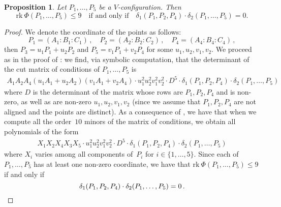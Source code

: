 \documentclass{amsart}
\theoremstyle{plain}
\newtheorem{prop}[lemma]{Proposition}
\theoremstyle{definition}
\newcommand{\rk}{\ensuremath{\mathrm{rk}}}
\begin{document}
\begin{prop}
\label{prop:d1d2}
Let $P_1, \dots, P_5$ be a $V$-configuration. Then
\[
\rk \ \Phi(P_1, \dots, P_5) \leq 9
\quad \mbox{
if and only if} \quad
\delta_1(P_1, P_2, P_4) \cdot \delta_2(P_1, \dots, P_5) = 0.
\]
\end{prop}
\begin{proof}
We denote the coordinate of the points as follows:
%
\[
 P_1 = (A_1: B_1: C_1) \,, \quad
 P_2 = (A_2: B_2: C_2) \,, \quad
 P_4 = (A_4: B_4: C_4) \,,
\]
%
then $P_3 = u_1P_1+u_2P_2$ and $P_5 = v_1P_1+v_2P_4$ for some $u_1, u_2, v_1, v_2$.
We proceed as in
the proof of : we find, via symbolic computation, that the determinant of
the cut matrix of conditions of $P_1, \dotsc, P_5$ is
%
\begin{gather}
\label{delta1delta2}
A_1A_2A_4(u_1A_1+u_2A_2)(v_1A_1+v_2A_4) \cdot u_1^2u_2^2v_1^2v_2^2 \cdot D^5 \cdot
\delta_1(P_1,P_2,P_4) \cdot \delta_2(P_1,\dots,P_5)
\end{gather}
%
where $D$ is the determinant of the matrix whose rows are $P_1, P_2, P_4$
and is non-zero, as well as are non-zero $u_1, u_2, v_1, v_2$ (since we
assume that $P_1, P_2, P_4$ are not aligned and the points are distinct).
As a consequence of , we have that when we compute all the order~$10$ minors of the matrix of conditions, we obtain all polynomials of the form
%
\begin{gather*}
X_1X_2X_4 X_3 X_5 \cdot u_1^2u_2^2v_1^2v_2^2 \cdot D^5 \cdot
\delta_1(P_1,P_2,P_4) \cdot \delta_2(P_1,\dots,P_5)
\end{gather*}
%
where $X_i$ varies among all components of~$P_i$ for $i \in \{1, \dotsc, 5\}$.
Since each of $P_1, \dotsc, P_5$ has at least one non-zero coordinate, we have that
$\rk \ \Phi(P_1, \dots, P_5) \leq 9$ if and only if
\[
\delta_1(P_1, P_2, P_4) \cdot \delta_2(P_1, \dots, P_5) = 0 \,. \qedhere
\]
\end{proof}
\end{document}
